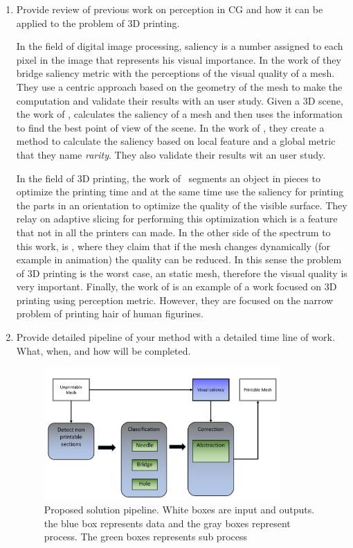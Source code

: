 \begin{enumerate}
  \item Provide review of previous work on perception in CG and how it can be applied to the problem of 3D printing.
	
	In the field of digital image processing, saliency is a number assigned to each pixel in the image that represents his visual importance. In the work of \cite{Kim2010} they bridge saliency metric with the perceptions of the visual quality of a mesh. They use a centric approach based on the geometry of the mesh to make the computation and validate their results with an user study. Given a 3D scene, the work of \cite{Feixas2009}, calculates the saliency of a mesh and then uses the information to find the best point of view of the scene. In the work of \cite{Wu2013}, they create a method to calculate the saliency based on local feature and a global metric that they name \emph{rarity}. They also validate their results wit an user study.
	
	In the field of 3D printing, the work of~\cite{Wang2015} segments an object in pieces to optimize the printing time and at the same time use the saliency for printing the parts in an orientation to optimize the quality of the visible surface. They relay on adaptive slicing for performing this optimization which is a feature that not in all the printers can made. In the other side of the spectrum to this work, is \cite{Torkhani2015}, where they claim that if the mesh changes dynamically (for example in animation) the quality can be reduced. In this sense the problem of 3D printing is the worst case, an static mesh, therefore the visual quality is very important. Finally, the work of \cite{Echevarria2014} is an example of a work focused on 3D printing using perception metric. However, they are focused on the narrow problem of printing hair of human figurines.
	
  \item Provide detailed pipeline of your method with a detailed time line of work. What, when, and how will be completed.
	
	\begin{figure}[htp]
		\centering
    \includegraphics[width=0.85\textwidth]{img/Pipeline2}
		\caption{Proposed solution pipeline. White boxes are input and outputs. the blue box represents data and the gray boxes represent process. The green boxes represents sub process}
		\label{fig:pipeline}
	\end{figure}
	

\end{enumerate}
